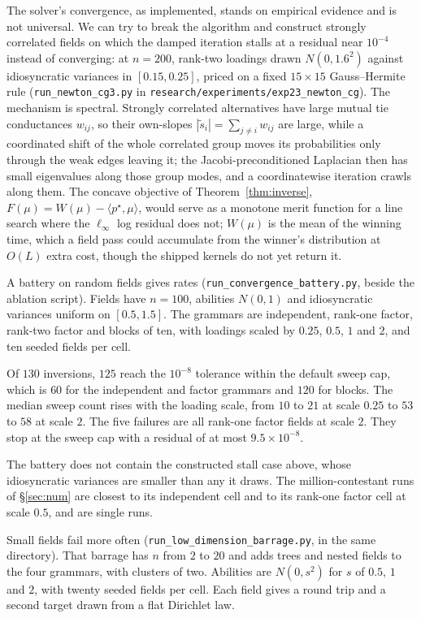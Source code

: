 \documentclass[11pt]{article}
\begin{document}
The solver's convergence, as implemented, stands on empirical evidence
and is not universal. We can try to break the algorithm and construct strongly
correlated fields on which the damped iteration stalls at a residual
near $10^{-4}$ instead of converging: at $n=200$, rank-two loadings drawn
$N(0,1.6^2)$ against idiosyncratic variances in $[0.15,0.25]$, priced on
a fixed $15\times15$ Gauss--Hermite rule (\texttt{run\_newton\_cg3.py} in
\texttt{research/experiments/exp23\_newton\_cg}).
The mechanism is spectral. Strongly correlated alternatives have large
mutual tie conductances $w_{ij}$, so their own-slopes
$|\tilde s_i|=\sum_{j\ne i}w_{ij}$ are large, while a coordinated shift of
the whole correlated group moves its probabilities only through the weak
edges leaving it; the Jacobi-preconditioned Laplacian then has small
eigenvalues along those group modes, and a coordinatewise iteration
crawls along them. The concave objective of Theorem~\ref{thm:inverse},
$F(\mu)=W(\mu)-\langle p^{\star},\mu\rangle$, would serve as a monotone
merit function for a line search where the $\ell_\infty$ log residual
does not; $W(\mu)$ is the mean of the winning time, which a field pass
could accumulate from the winner's distribution at $O(L)$ extra cost,
though the shipped kernels do not yet return it.

A battery on random fields gives rates
(\texttt{run\_convergence\_battery.py}, beside the ablation script).
Fields have $n=100$, abilities $N(0,1)$ and idiosyncratic variances
uniform on $[0.5,1.5]$. The grammars are independent, rank-one factor,
rank-two factor and blocks of ten, with loadings scaled by $0.25$,
$0.5$, $1$ and $2$, and ten seeded fields per cell.

Of $130$ inversions, $125$ reach the $10^{-8}$ tolerance within the
default sweep cap, which is $60$ for the independent and factor grammars
and $120$ for blocks. The median sweep count rises with the loading
scale, from $10$ to $21$ at scale $0.25$ to $53$ to $58$ at scale $2$.
The five failures are all rank-one factor fields at scale $2$. They stop
at the sweep cap with a residual of at most $9.5\times10^{-8}$.

The battery does not contain the constructed stall case above, whose
idiosyncratic variances are smaller than any it draws. The
million-contestant runs of \S\ref{sec:num} are closest to its independent
cell and to its rank-one factor cell at scale $0.5$, and are single runs.

Small fields fail more often
(\texttt{run\_low\_dimension\_barrage.py}, in the same directory). That
barrage has $n$ from $2$ to $20$ and adds trees and nested fields to the
four grammars, with clusters of two. Abilities are $N(0,s^2)$ for $s$ of
$0.5$, $1$ and $2$, with twenty seeded fields per cell. Each field gives
a round trip and a second target drawn from a flat Dirichlet law.
\end{document}

